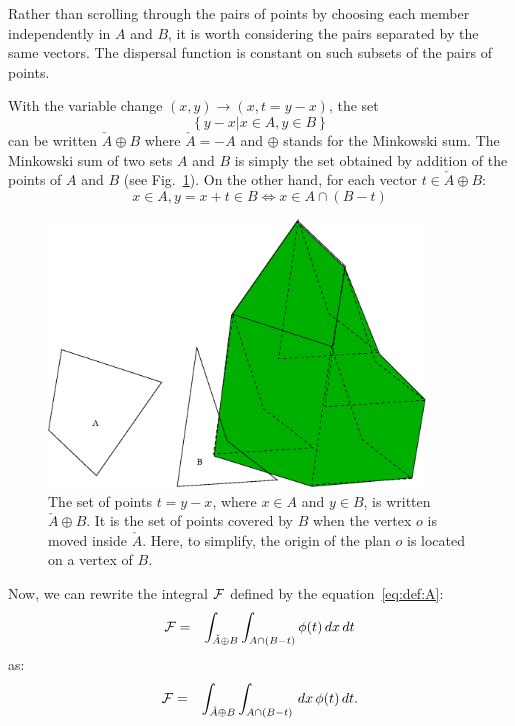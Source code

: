 \medskip

Rather than scrolling through the pairs of points by choosing 
each member independently in  $A$ and $B$,
it is worth considering the pairs separated by the same vectors.
The dispersal function is constant on such subsets  of the pairs of
points.

\medskip
With the variable change $(x,y)\rightarrow (x,t=y-x)$, the set
\begin{equation*}
  \left\{y-x|x\in A, y\in B\right\}
\end{equation*}
can be written  $\check{A}\oplus B$ where $\check{A}=-A$
and $\oplus$ stands for the Minkowski sum.
The Minkowski sum of two sets $A$ and $B$ is simply the set obtained
by addition of the points of $A$ and $B$ (see
Fig.~\ref{fig:minkowski}). On the other hand, for each
vector $t\in \check{A}\oplus B$: 
\begin{equation*}
  x\in A, y=x+t\in B \Leftrightarrow x\in A\cap\left(B-t\right) 
\end{equation*}

\begin{figure}[htbp]
  \begin{center}
    \includegraphics[width=10cm]{./VignetteDir/graphics/integral_geom_4.eps}
    \caption{The set of points $t=y-x$, where $x\in A$ and 
$y\in B$, is written $\check{A}\oplus B$. 
It is the set of points
covered by $B$ when the vertex $o$ is moved inside $\check{A}$.
Here, to simplify, the origin of the plan $o$ is
located on a vertex of  $B$.}
    \label{fig:minkowski}
  \end{center}
\end{figure}

Now, we can rewrite the integral ${\cal F}$ 
defined by the equation~\eqref{eq:def:A}:
\begin{eqnarray}
  {\cal F} &=& \int_{\check{A}\oplus B}\int_{A\cap \left(B-t\right)} 
  \phi(t) \,dx\,dt
\end{eqnarray}
as:
\begin{eqnarray}
  {\cal F} & = & \int_{\check{A}\oplus B}\int_{A\cap \left(B-t\right)} 
  \,dx\, \phi(t) \,dt.
\end{eqnarray}

